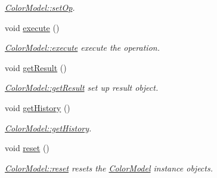 \begin{DoxyCompactItemize}
\begin{DoxyCompactList}\small\item\em \hyperlink{class_color_model_ad51072410fbe8572066b3a53ca85a289}{Color\+Model\+::set\+Op}. \end{DoxyCompactList}\item 
\mbox{\label{class_color_model_a3fcb0b558eb03b628a898f845dcb8640}} 
void \hyperlink{class_color_model_a3fcb0b558eb03b628a898f845dcb8640}{execute} ()
\begin{DoxyCompactList}\small\item\em \hyperlink{class_color_model_a3fcb0b558eb03b628a898f845dcb8640}{Color\+Model\+::execute} execute the operation. \end{DoxyCompactList}\item 
\mbox{\label{class_color_model_ab64c059ce583856ec5dd9e35244ac92d}} 
void \hyperlink{class_color_model_ab64c059ce583856ec5dd9e35244ac92d}{get\+Result} ()
\begin{DoxyCompactList}\small\item\em \hyperlink{class_color_model_ab64c059ce583856ec5dd9e35244ac92d}{Color\+Model\+::get\+Result} set up result object. \end{DoxyCompactList}\item 
void \hyperlink{class_color_model_a90bcf6ca5b8d00a14a8153970594de97}{get\+History} ()
\begin{DoxyCompactList}\small\item\em \hyperlink{class_color_model_a90bcf6ca5b8d00a14a8153970594de97}{Color\+Model\+::get\+History}. \end{DoxyCompactList}\item 
\mbox{\label{class_color_model_af5f09a79d9964daefb3ceac9c45f0034}} 
void \hyperlink{class_color_model_af5f09a79d9964daefb3ceac9c45f0034}{reset} ()
\begin{DoxyCompactList}\small\item\em \hyperlink{class_color_model_af5f09a79d9964daefb3ceac9c45f0034}{Color\+Model\+::reset} resets the \hyperlink{class_color_model}{Color\+Model} instance objects. \end{DoxyCompactList}\end{DoxyCompactItemize}
